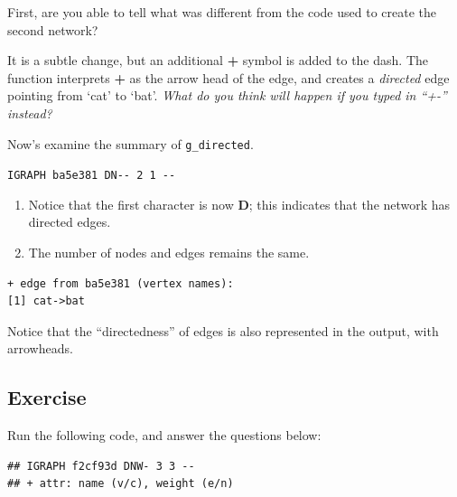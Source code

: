 \documentclass[
]{book}
\newenvironment{Shaded}{\begin{snugshade}}{\end{snugshade}}
\newcommand{\DecValTok}[1]{\textcolor[rgb]{0.00,0.00,0.81}{#1}}
\newcommand{\FunctionTok}[1]{\textcolor[rgb]{0.13,0.29,0.53}{\textbf{#1}}}
\newcommand{\NormalTok}[1]{#1}
\newcommand{\OtherTok}[1]{\textcolor[rgb]{0.56,0.35,0.01}{#1}}
\newcommand{\SpecialCharTok}[1]{\textcolor[rgb]{0.81,0.36,0.00}{\textbf{#1}}}
\providecommand{\tightlist}{%
  \setlength{\itemsep}{0pt}\setlength{\parskip}{0pt}}
\begin{document}
First, are you able to tell what was different from the code used to create the second network?

It is a subtle change, but an additional \textbf{+} symbol is added to the dash. The function interprets \textbf{+} as the arrow head of the edge, and creates a \emph{directed} edge pointing from `cat' to `bat'. \emph{What do you think will happen if you typed in ``+-'' instead?}

Now's examine the summary of \texttt{g\_directed}.

\texttt{IGRAPH\ ba5e381\ DN-\/-\ 2\ 1\ -\/-}

\begin{enumerate}
\def\labelenumi{\arabic{enumi}.}
\tightlist
\item
  Notice that the first character is now \textbf{D}; this indicates that the network has directed edges.
\item
  The number of nodes and edges remains the same.
\end{enumerate}

\begin{verbatim}
+ edge from ba5e381 (vertex names):
[1] cat->bat
\end{verbatim}

Notice that the ``directedness'' of edges is also represented in the output, with arrowheads.

\subsection{Exercise}\label{exercise-2}

Run the following code, and answer the questions below:

\begin{Shaded}
\end{Shaded}

\begin{verbatim}
## IGRAPH f2cf93d DNW- 3 3 -- 
## + attr: name (v/c), weight (e/n)
\end{verbatim}
\end{document}
